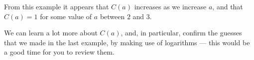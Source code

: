 \begin{eg}
%
From this example it appears that $C(a)$ increases as we increase $a$,
and that $C(a) = 1$ for some value of $a$ between $2$ and $3$.
\end{eg}


We can learn a lot more about $C(a)$, and, in particular, confirm the
guesses that we made in the last example, by making use of logarithms ---
this would be a good time for you to review them.

